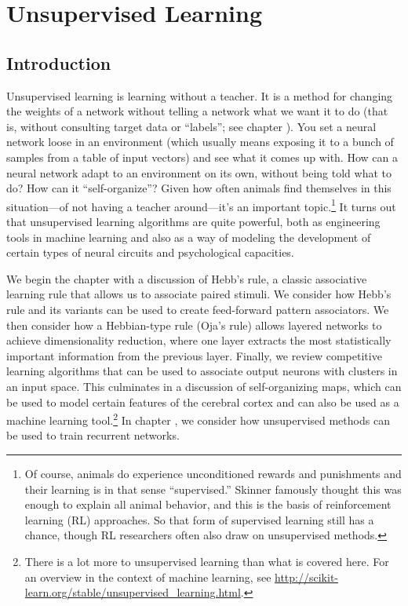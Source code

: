 \chapter{Unsupervised Learning}\label{ch_unsupervised}

\section{Introduction}

Unsupervised learning is learning without a teacher. It is a method for changing the weights of a network without telling a network what we want it to do (that is, without consulting target data or ``labels''; see chapter ). You set a neural network loose in an environment (which usually means exposing it to a bunch of samples from a table of input vectors) and see what it comes up with. How can a neural network adapt to an environment on its own, without being told what to do?  How can it ``self-organize''? Given how often animals find themselves in this situation---of not having a teacher around---it's an important topic.\footnote{Of course, animals do experience unconditioned rewards and punishments and their learning is in that sense ``supervised.'' Skinner famously thought this was enough to explain all animal behavior, and this is the basis of reinforcement learning (RL) approaches. So that form of supervised learning still has a chance, though RL researchers often also draw on unsupervised methods.} It turns out that unsupervised learning algorithms are quite powerful, both as engineering tools in machine learning and also as a way of modeling the development of certain types of neural circuits and psychological capacities.

We begin the chapter with a discussion of Hebb's rule, a classic associative learning rule that allows us to associate paired stimuli. We consider how Hebb's rule and its variants can be used to create feed-forward pattern associators. We then consider how a Hebbian-type rule (Oja's rule) allows layered networks to achieve dimensionality reduction, where one layer extracts the most statistically important information from the previous layer. Finally, we review competitive learning algorithms that can be used to associate output neurons with clusters in an input space. This culminates in a discussion of self-organizing maps, which can be used to model certain features of the cerebral cortex and can also be used as a machine learning tool.\footnote{There is a lot more to unsupervised learning than what is covered here. For an overview in the context of machine learning, see \url{http://scikit-learn.org/stable/unsupervised_learning.html}.}  In chapter , we consider how unsupervised methods can be used to train recurrent networks.

